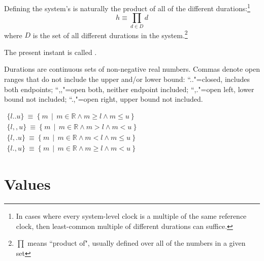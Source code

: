 \pn Defining the system's  is naturally the product of all of the different 
durations:\footnote{In cases where every system-level clock is a multiple of the same reference clock, then least-common multiple of different durations can suffice.}
\[h\equiv\prod_{d\in D} d\]
where $D$ is the set of all different durations in the system.\footnote{$\prod$ means ``product of", usually defined over all of the numbers in a given set}  

\pn The present instant is called .


\pn   Durations are continuous sets of non-negative real numbers.  Commas denote open ranges that do not include the upper and/or lower bound: ``.."=closed, includes both endpoints;
``,,"=open both, neither endpoint included;
``,."=open left, lower bound not included;
``.,"=open right, upper bound not included.

\(
\begin{array}{l}
\{l..u\}~\equiv~ \{~m~~\vert~~m\in\mathbb{R}\wedge m\ge l\wedge m\le u~\} \\
\{l,,u\}~\equiv~ \{~m~~\vert~~m\in\mathbb{R}\wedge m>l\wedge m<u~\} \\
\{l,.u\}~\equiv~ \{~m~~\vert~~m\in\mathbb{R}\wedge m<l\wedge m\le u~\} \\
\{l.,u\}~\equiv~ \{~m~~\vert~~m\in\mathbb{R}\wedge m\ge l\wedge m<u~\}
\end{array}
\)



\section{Values}\label{sec:informal_values}

